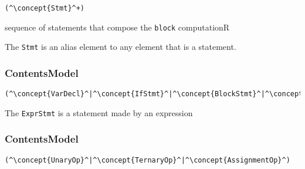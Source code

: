 \begin{lstlisting}[style=default]
(^\concept{Stmt}^+)
\end{lstlisting}

\begin{HIRChildElements}
	{sequence of statements that compose the {\tt block} computation}{R}
\end{HIRChildElements}

The {\tt Stmt} is an alias element to any element that is a statement. 

\subsubsection*{ContentsModel}{}

\begin{lstlisting}[style=default]
(^\concept{VarDecl}^|^\concept{IfStmt}^|^\concept{BlockStmt}^|^\concept{IfStmt}^|^\concept{ExprStmt}^)
\end{lstlisting}

The {\tt ExprStmt} is a statement made by an expression

\subsubsection*{ContentsModel}{}

\begin{lstlisting}[style=default]
(^\concept{UnaryOp}^|^\concept{TernaryOp}^|^\concept{AssignmentOp}^)
\end{lstlisting}
